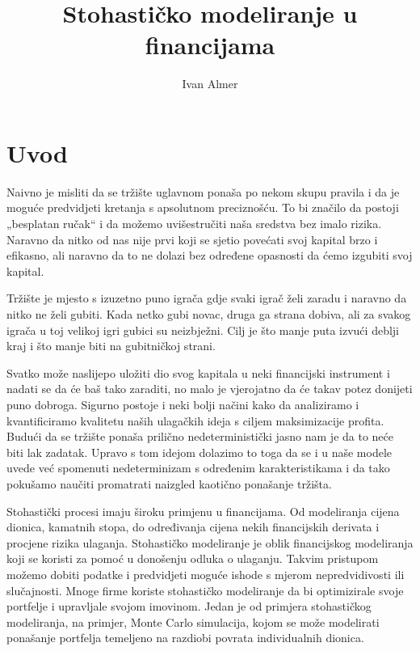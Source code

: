 \documentclass[times, utf8, seminar]{fer}
\begin{document}
\title{Stohastičko modeliranje u financijama}

\author{Ivan Almer}


\maketitle

\tableofcontents

\chapter{Uvod}
Naivno je misliti da se tržište uglavnom ponaša po nekom skupu pravila i da je moguće predvidjeti kretanja s apsolutnom preciznošću. To bi značilo da postoji „besplatan ručak“ i da možemo uvišestručiti naša sredstva bez imalo rizika. Naravno da nitko od nas nije prvi koji se sjetio povećati svoj kapital brzo i efikasno, ali naravno da to ne dolazi bez određene opasnosti da ćemo izgubiti svoj kapital.

Tržište je mjesto s izuzetno puno igrača gdje svaki igrač želi zaradu i naravno da nitko ne želi gubiti. Kada netko gubi novac, druga ga strana dobiva, ali za svakog igrača u toj velikoj igri gubici su neizbježni. Cilj je što manje puta izvući deblji kraj i što manje biti na gubitničkoj strani.

Svatko može naslijepo uložiti dio svog kapitala u neki financijski instrument i nadati se da će baš tako zaraditi, no malo je vjerojatno da će takav potez donijeti puno dobroga. Sigurno postoje i neki bolji načini kako da analiziramo i kvantificiramo kvalitetu naših ulagačkih ideja s ciljem maksimizacije profita. Budući da se tržište ponaša prilično nedeterministički jasno nam je da to neće biti lak zadatak. Upravo s tom idejom dolazimo to toga da se i u naše modele uvede već spomenuti nedeterminizam s određenim karakteristikama i da tako pokušamo naučiti promatrati naizgled kaotično ponašanje tržišta.

Stohastički procesi imaju široku primjenu u financijama. Od modeliranja cijena dionica, kamatnih stopa, do određivanja cijena nekih financijskih derivata i procjene rizika ulaganja. Stohastičko modeliranje je oblik financijskog modeliranja koji se koristi za pomoć u donošenju odluka o ulaganju. Takvim pristupom možemo dobiti podatke i predvidjeti moguće ishode s mjerom nepredvidivosti ili slučajnosti. Mnoge firme koriste stohastičko modeliranje da bi optimizirale svoje portfelje i upravljale svojom imovinom. Jedan je od primjera stohastičkog modeliranja, na primjer, Monte Carlo simulacija, kojom se može modelirati ponašanje portfelja temeljeno na razdiobi povrata individualnih dionica.
\end{document}
